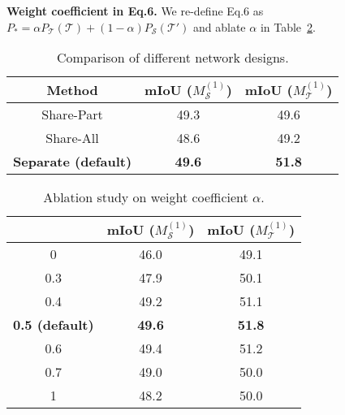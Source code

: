 \documentclass[10pt,twocolumn,letterpaper]{article}
\begin{document}
\noindent\textbf{Weight coefficient  in Eq.6.} We re-define Eq.6 as ${P_*}=\alpha P_{\mathcal{T}}(\mathcal{T})+ (1-\alpha)P_{\mathcal{S}}(\mathcal{T'})$ and ablate $\alpha$ in Table~\ref{tab:Ablation_weights}.
\begin{table}[h]  
  \centering  
  \small
  \vspace{1em}
  \caption{Comparison of different network designs.}  

  \label{tab:Comp_diff_seg_choice}
        \begin{tabular}{ccc}
        \toprule
        Method& mIoU (${M^{(1)}_{\mathcal{S}}}$) & mIoU (${M^{(1)}_{\mathcal{T}}}$)\\
        \hline
       Share-Part &49.3  & 49.6\\
       Share-All &48.6  &49.2\\
       \hline
     \bf{Separate (default)}& \bf{49.6} & \bf{51.8}\\
        \bottomrule
        \end{tabular}
        \vspace{1em}
\end{table}  

\begin{table}[h]
	\centering  
	\small
	\caption{Ablation study on weight coefficient $\alpha$.}  
	\label{tab:Ablation_weights}
	\begin{tabular}{ccc}
		\toprule
		\makecell{$\alpha$} & mIoU (${M^{(1)}_{\mathcal{S}}}$) & mIoU (${M^{(1)}_{\mathcal{T}}}$)\\
		\hline
	0 & 46.0 & 49.1 \\ 
	0.3 & 47.9 & 50.1 \\  
	0.4 & 49.2 & 51.1 \\  
	\textbf{0.5 (default)} & \textbf{49.6} & \textbf{51.8}  \\
	0.6 & 49.4 & 51.2 \\ 
	0.7 & 49.0 & 50.0 \\  
	1 & 48.2 & 50.0 \\ 
	\bottomrule
	\end{tabular}
	\end{table}

\clearpage
 
\end{document}
